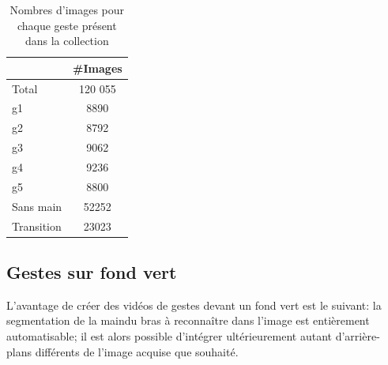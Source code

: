 \begin{table}
	\centering
	\caption{}
	\label{tab:videoGestes}
	\begin{tabular}{|l|c|}
		\hline
        			& \#Images \\
		\hline
        Total		& 120 055 \\
		\hline
        g1          & 8890  \\
        g2          & 8792  \\
        g3          & 9062  \\
        g4          & 9236  \\
        g5          & 8800  \\
        Sans main   & 52252 \\        
		\hline
        Transition	& 23023 \\
		\hline
	\end{tabular}
\caption{Nombres d’images pour chaque geste présent dans la collection}
\end{table}






\subsection{Gestes sur fond vert}


L'avantage de créer des vidéos de gestes devant un fond vert est le suivant: la segmentation de la main\/du bras à reconnaître dans l'image est entièrement automatisable; il est alors possible d'intégrer ultérieurement autant d'arrière-plans différents de l'image acquise que souhaité. 

